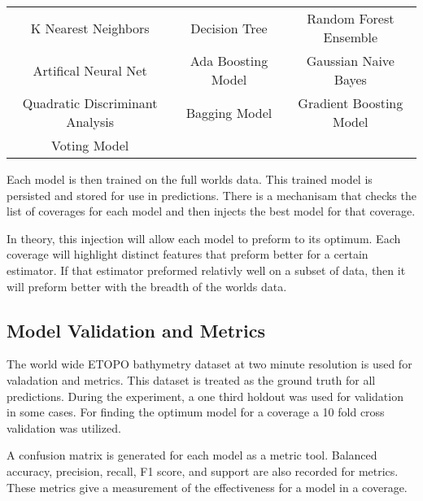 \begin{table}[htbp]
    \begin{tabular} { |c|c|c| }
        \hline
            K Nearest Neighbors & Decision Tree & Random Forest Ensemble \\
            Artifical Neural Net & Ada Boosting Model & Gaussian Naive Bayes \\
            Quadratic Discriminant Analysis & Bagging Model & Gradient Boosting Model \\
            Voting Model & & \\
        \hline
    \end{tabular}
\end{table}

\par
Each model is then trained on the full worlds data.
This trained model is persisted and stored for use in predictions.
There is a mechanisam that checks the list of coverages for each model and then injects the best model for that coverage.

\par
In theory, this injection will allow each model to preform to its optimum.
Each coverage will highlight distinct features that preform better for a certain estimator.
If that estimator preformed relativly well on a subset of data, then it will preform better with the breadth of the worlds data.


\subsection{Model Validation and Metrics}
The world wide ETOPO bathymetry dataset \cite{national1988etopo} at two minute resolution is used for valadation and metrics.
This dataset is treated as the ground truth for all predictions.
During the experiment, a one third holdout was used for validation in some cases.
For finding the optimum model for a coverage a 10 fold cross validation was utilized.


\par
A confusion matrix is generated for each model as a metric tool.
Balanced accuracy, precision, recall, F1 score, and support are also recorded for metrics.
These metrics give a measurement of the effectiveness for a model in a coverage.

